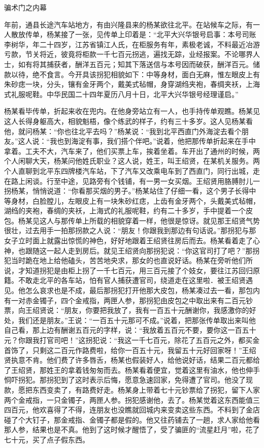 \documentclass[12pt,UTF8]{ctexbook}
\begin{document}
骗术门之内幕


年前，通县长途汽车站地方，有由兴隆县来的杨某欲往北平。在站候车之际，有一人散放传单，杨某接了一张，见传单上印着是：“北平大兴华银号启事：本号司账李树华，年二十四岁，江苏省镇江人氏，在柜服务有年，素极老诚，不料最近冶游亏款，节关将近，彼竟将柜款一千七百元拐逃，遍找无踪，业经报案。不论哪界人士，如有将其捕获者，酬洋五百元；知其下落送信与本号因而破获，酬洋百元。储款以待，绝不食言。今开具该拐犯相貌如下：中等身材，面白无麻，惟左眼皮上有朱砂痣一块，分头，镶有金牙两个，戴美式毡帽，身穿湖绉夹袍，春绸夹袄，上海式礼服呢鞋。中华民国二十四年夏历八月十日，北平大兴华银号经理谨启。”

杨某看毕传单，折起来收在兜内。在他身旁站立有一人，也手持传单观瞧。杨某见这人长得身躯高大，相貌魁梧，像个练武的样子，约有三十多岁。这人见杨某看他，就问杨某：“你也往北平去吗？”杨某说：“我到北平西直门外海淀去看个朋友。”这人说：“我也到海淀有事，我们搭个伴吧。”说着，他把那传单折起来在手中拿着。工夫不大，汽车来了，他们买票上车，挨着坐着。车开出了通州的时候，两个人闲聊大天，杨某问他姓氏职业？这人说，姓王，叫王绍贤，在某机关服务。两个人直聊到北平东四牌楼汽车站，下了汽车又改乘电车到了西直门，同行出城，走在路上闲谈。行至中途，见路旁有个钱铺，有一男一女买烟。王绍贤用胳膊肘儿一拐杨某，悄悄说道：“你看那买烟的男子。”杨某站住了仔细一看，这个男子长得中等身材，白脸膛儿，左眼皮上有一块朱砂红痣，上齿有金牙两个，头戴美式毡帽，湖绉的夹袍，春绸的夹袄，上海式的礼服呢鞋，约有二十多岁，手中提着一个皮包。杨某见这人与那传单上所载的相貌穿着一样，他很是惊讶。就见那王绍贤气势很壮，过去用手一拍那拐款之人说：“朋友！你跟我到那边有句话说。”那拐犯与那女子立时面上就露出惊慌的神色，好好地跟着王绍贤往房后而去。杨某看着走了心神，也跟随这一起人走到房后。就见王绍贤向那拐犯说：“你这官司打了吧？”那拐犯当时跪在地上给他磕头，苦苦地央求，那女的也直说好话。杨某在旁听他们所说，才知道拐犯是由柜上拐了一千七百元，用三百元接了个妓女，要往江苏回归原籍。不敢走北平的各车站，怕有官人捕获遭官司，绕道走在这里啦．被王绍贤遇见。他怎么哀求也是不成，最后那拐犯打开他那大皮包，杨某凑过去一看，那包内有一对赤金镯子，四个金戒指，两匣人参，那拐犯由皮包之中取出来有二百元钞票，向王绍贤说：“朋友，你要把我放了，我有一百五十元酬谢你，我感激你的好处，我们还是朋友。”王说：“一百五十元那可不成。”说着，把那张传单取出来叫他自己看，那上边有酬谢五百元的字样，说：“我放着五百元不要，要你这一百五十元？你跟我打官司吧！”这拐犯说：“我这一千七百元，除花了五百元之外，都买金首饰了，只剩这二百元作路费啦，给你一百五十元，我留五十元好回家呀！”王绍贤执意不肯。他们费了许多唇舌，杨某也假装好人，给他说好话，结果二百元都给了王绍贤，那姓王的拿着钱匆匆而去。杨某看着便宜，觉着这里有油水，他也伸手恫吓拐犯。那拐犯到了这时表示后悔，愿意急速回家，免得遭了官司。他没了现款，愿把东西变卖了，有路费好走。杨某身上带着七十元钞票给了拐犯，留下人家两个金戒指，一只金镯子，两匣人参。拐犯感谢他，去了。杨某觉着这东西能值三四百元，他欢喜得了不得，连朋友也没瞧就回城内来变卖这些东西。不料到了金店碰了个大钉子，那金戒指、金镯子都是假的。他又往药铺去了一趟，求人家给他看那人参，结果也是不真。他到了这时候才醒悟了，受了骗匪的“流星赶月”啦，花了七十元，买了点子假东西。
\end{document}
